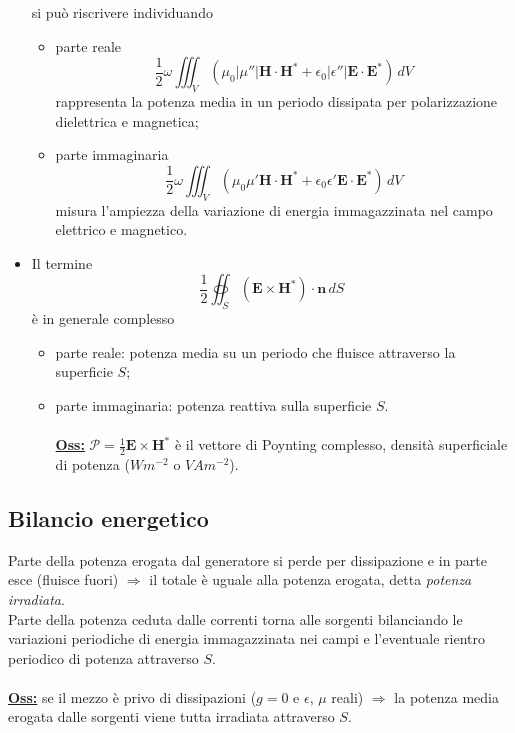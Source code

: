 \documentclass[a4paper]{article}
\begin{document}
\begin{itemize}
si può riscrivere individuando
\begin{itemize}
\item parte reale
\begin{equation*}
\frac{1}{2}\omega\iiint_V(\mu_0|\mu''|\textbf{H}\cdot\textbf{H}^*+\epsilon_0|\epsilon''|\textbf{E}\cdot\textbf{E}^*)\,dV
\end{equation*}
rappresenta la potenza media in un periodo dissipata per polarizzazione dielettrica e magnetica;
\item parte immaginaria
\begin{equation*}
\frac{1}{2}\omega\iiint_V(\mu_0\mu'\textbf{H}\cdot\textbf{H}^*+\epsilon_0\epsilon'\textbf{E}\cdot\textbf{E}^*)\,dV
\end{equation*}
misura l'ampiezza della variazione di energia immagazzinata nel campo elettrico e magnetico.
\end{itemize}
\item Il termine
\begin{equation*}
\frac{1}{2}\oiint_S(\textbf{E}\times\textbf{H}^*)\cdot\textbf{n}\,dS
\end{equation*}
è in generale complesso
\begin{itemize}
\item parte reale: potenza media su un periodo che fluisce attraverso la superficie $S$;
\item parte immaginaria: potenza reattiva sulla superficie $S$.\\\\
\underline{\textbf{Oss:}} $\bm{\mathcal{P}}=\frac{1}{2}\textbf{E}\times\textbf{H}^*$ è il vettore di Poynting complesso, densità superficiale di potenza ($Wm^{-2}$ o $VAm^{-2}$).
\end{itemize}
\end{itemize}
\subsection*{Bilancio energetico}
Parte della potenza erogata dal generatore si perde per dissipazione e in parte esce (fluisce fuori) $\Rightarrow$ il totale è uguale alla potenza erogata, detta \emph{potenza irradiata}.\\
Parte della potenza ceduta dalle correnti torna alle sorgenti bilanciando le variazioni periodiche di energia immagazzinata nei campi e l'eventuale rientro periodico di potenza attraverso $S$.\\\\
\underline{\textbf{Oss:}} se il mezzo è privo di dissipazioni ($g=0$ e $\epsilon$, $\mu$ reali) $\Rightarrow$ la potenza media erogata dalle sorgenti viene tutta irradiata attraverso $S$.
\end{document}
